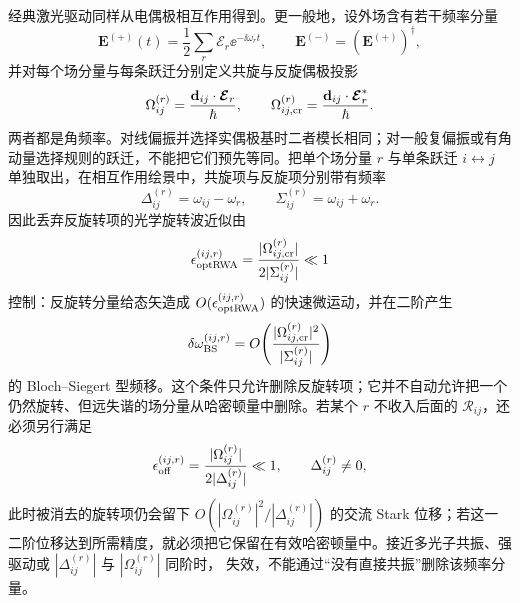经典激光驱动同样从电偶极相互作用得到。更一般地，设外场含有若干频率分量
\begin{equation}
\mathbf E^{(+)}(t)
=\frac12\sum_r\boldsymbol{\mathcal E}_r
\ee^{-\ii\omega_rt},
\qquad
\mathbf E^{(-)}=(\mathbf E^{(+)})^\dagger,
\label{eq:phys-oqs-multitone-classical-field}
\end{equation}
并对每个场分量与每条跃迁分别定义共旋与反旋偶极投影
\begin{equation}
\Omega_{ij}^{(r)}
=\frac{\mathbf d_{ij}\cdot\boldsymbol{\mathcal E}_r}{\hbar},
\qquad
\Omega_{ij,{\rm cr}}^{(r)}
=\frac{\mathbf d_{ij}\cdot\boldsymbol{\mathcal E}_r^*}{\hbar}.
\label{eq:phys-oqs-general-rabi-frequency}
\end{equation}
两者都是角频率。对线偏振并选择实偶极基时二者模长相同；对一般复偏振或有角动量选择规则的跃迁，不能把它们预先等同。把单个场分量 $r$ 与单条跃迁 $i\leftrightarrow j$ 单独取出，在相互作用绘景中，共旋项与反旋项分别带有频率
\[
\Delta_{ij}^{(r)}=\omega_{ij}-\omega_r,
\qquad
\Sigma_{ij}^{(r)}=\omega_{ij}+\omega_r.
\]
因此丢弃反旋转项的光学旋转波近似由
\begin{equation}
\epsilon_{\rm optRWA}^{(ij,r)}
=\frac{|\Omega_{ij,{\rm cr}}^{(r)}|}{2|\Sigma_{ij}^{(r)}|}
\ll1
\label{eq:phys-oqs-classical-optical-rwa-control}
\end{equation}
控制：反旋转分量给态矢造成 $O(\epsilon_{\rm optRWA}^{(ij,r)})$ 的快速微运动，并在二阶产生
\[
\delta\omega_{\rm BS}^{(ij,r)}
=O\!\left(\frac{|\Omega_{ij,{\rm cr}}^{(r)}|^2}{|\Sigma_{ij}^{(r)}|}\right)
\]
的 Bloch--Siegert 型频移。这个条件只允许删除反旋转项；它并不自动允许把一个仍然旋转、但远失谐的场分量从哈密顿量中删除。若某个 $r$ 不收入后面的 $\mathcal R_{ij}$，还必须另行满足
\begin{equation}
\epsilon_{\rm off}^{(ij,r)}
=\frac{|\Omega_{ij}^{(r)}|}{2|\Delta_{ij}^{(r)}|}
\ll1,
\qquad \Delta_{ij}^{(r)}\ne0,
\label{eq:phys-oqs-classical-offresonant-control}
\end{equation}
此时被消去的旋转项仍会留下
$O(|\Omega_{ij}^{(r)}|^2/|\Delta_{ij}^{(r)}|)$ 的交流 Stark 位移；若这一二阶位移达到所需精度，就必须把它保留在有效哈密顿量中。接近多光子共振、强驱动或 $|\Delta_{ij}^{(r)}|$ 与 $|\Omega_{ij}^{(r)}|$ 同阶时， 失效，不能通过“没有直接共振”删除该频率分量。

